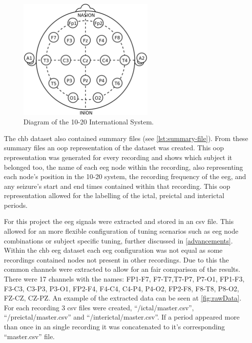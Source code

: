 \documentclass[12pt]{article}
\begin{document}
\begin{figure}[H]
\includegraphics[width=0.6\textwidth]{10-20}
\centering
\caption{Diagram of the 10-20 International System. \protect\cite{tomaton1242010}}
\label{fig:10-20}
\end{figure}




The \acrshort{chb} dataset also contained summary files (see \ref{lst:summary-file}). From these summary files an \acrfull{oop} representation of the dataset was created. This \acrshort{oop} representation was generated for every recording and shows which subject it belonged too, the name of each \acrshort{eeg} node within the recording, also representing each node's position in the 10-20 system, the recording frequency of the \acrshort{eeg}, and any seizure's start and end times contained within that recording. This \acrshort{oop} representation allowed for the labelling of the ictal, preictal and interictal periods.

For this project the \acrshort{eeg} signals were extracted and stored in an \acrshort{csv} file. This allowed for an more flexible configuration of tuning scenarios such as \acrshort{eeg} node combinations or subject specific tuning, further discussed in \ref{advancements}. Within the \acrshort{chb} \acrshort{eeg} dataset each \acrshort{eeg} configuration was not equal as some recordings contained nodes not present in other recordings. Due to this the common channels were extracted to allow for an fair comparison of the results. There were 17 channels with the names: FP1-F7, F7-T7,T7-P7, P7-O1, FP1-F3, F3-C3, C3-P3, P3-O1, FP2-F4, F4-C4, C4-P4, P4-O2, FP2-F8, F8-T8, P8-O2, FZ-CZ, CZ-PZ. An example of the extracted data can be seen at \ref{fig:rawData}. For each recording 3 \acrshort{csv} files were created, ``/ictal/master.csv'', ``/preictal/master.csv'' and ``/interictal/master.csv''. If a period appeared more than once in an single recording it was concatenated to it's corresponding ``master.csv'' file.
\end{document}
